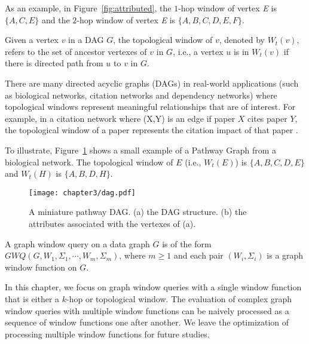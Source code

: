 As an example, in Figure~\ref{fig:attributed}, the $1$-hop window of vertex \emph{E} is $\{A,C,E\}$ and the $2$-hop window of vertex \emph{E} is $\{A,B,C,D,E,F\}$.  

\begin{definition} 
Given a vertex $v$ in a DAG $G$, the topological window of $v$, denoted by $W_t(v)$,
refers to the set of ancestor vertexes of $v$ in $G$,
i.e., a vertex $u$ is in $W_t(v)$ if there is directed path from $u$ to $v$ in $G$.
\end{definition}

There are many directed acyclic graphs (DAGs) in real-world applications (such as biological networks, citation networks and dependency networks)
where topological windows represent meaningful relationships that are of interest.
For example, in a citation network where (X,Y) is an edge if paper $X$ cites paper $Y$, 
the topological window of a paper represents the citation impact of that paper \cite{campanario2011empirical,holsapple2003citation,ma2008bringing}.

To illustrate, Figure~\ref{fig:topological} shows a small example of a Pathway Graph from a biological network. 
The topological window of $E$ (i.e., $W_t(E)$) is $\{A, B, C, D, E\}$ and $W_t(H)$ is $\{A, B, D, H\}$.


\begin{figure}[h]
\centering
 \texttt{[image: chapter3/dag.pdf]}
	\caption{A miniature pathway DAG. (a) the DAG structure. (b) the attributes associated with the vertexes of (a).}
	\label{fig:topological}
\end{figure}

\begin{definition} 
A graph window query on a data graph $G$ is of the form
$GWQ(G, W_1, \Sigma_1,\cdots, W_m, \Sigma_m)$, where $m \geq 1$
and
each pair $(W_i,\Sigma_i)$ is a graph window function on $G$.
\end{definition}
In this chapter, we focus on graph window queries with a single window 
function that is either a $k$-hop or topological window. 
The evaluation of complex graph window queries with multiple window 
functions can be naively processed as a sequence of window functions one
after another. 
We leave the optimization of processing multiple window functions for future studies.

